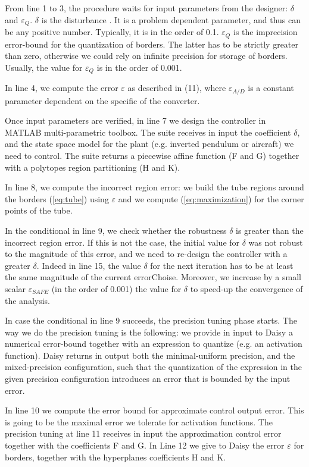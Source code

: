 From line 1 to 3, the procedure waits for input parameters from the designer: $\delta$ and $\varepsilon_{Q}$. $\delta$ is the disturbance . It is a problem dependent parameter, and thus can be any positive number. Typically, it is in the order of 0.1.
$\varepsilon_{Q}$ is the imprecision error-bound for the quantization of borders. 
The latter has to be strictly greater than zero, otherwise we could rely on infinite precision for storage of borders. Usually, the value for $\varepsilon_{Q}$ is in the order of 0.001.

In line 4, we compute the error $\varepsilon$ as described in (11), where $\varepsilon_{A/D}$ is a constant parameter dependent on the specific of the converter.

Once input parameters are verified, in line 7 we design the controller in MATLAB multi-parametric toolbox. The suite receives in input the coefficient $\delta$, and the state space model for the plant (e.g. inverted pendulum or aircraft) we need to control. The suite returns a piecewise affine function (F and G) together with a polytopes region partitioning (H and K).

In line 8, we compute the incorrect region error: we build the tube regions around the borders (\ref{eq:tube})  using $\varepsilon$ and we compute (\ref{eq:maximization}) for the corner points of the tube.

In the conditional in line 9, we check whether the robustness $\delta$ is greater than the incorrect region error. If this is not the case, the initial value for $\delta$ was not robust to the magnitude of this error, and we need to re-design the controller with a greater $\delta$. 
Indeed in line 15, the value $\delta$ for the next iteration has to be at least the same magnitude of the current errorChoise. Moreover, we increase by a small scalar $\varepsilon_{SAFE}$ (in the order of 0.001) the value for $\delta$ to speed-up the convergence of the analysis. 

In case the conditional in line 9 succeeds, the precision tuning phase starts. The way we do the precision tuning is the following: we provide in input to Daisy a numerical error-bound together with an expression to quantize (e.g. an activation function). Daisy returns in output both the minimal-uniform precision, and the mixed-precision configuration, such that the quantization of the expression in the given precision configuration introduces an error that is bounded by the input error.

In line 10 we compute the error bound for approximate control output error. This is going to be the maximal error we tolerate for activation functions. The precision tuning at line 11 receives in input the approximation control error together with the coefficients F and G. In Line 12 we give to Daisy the error $\varepsilon$ for borders, together with the hyperplanes coefficients H and K.

